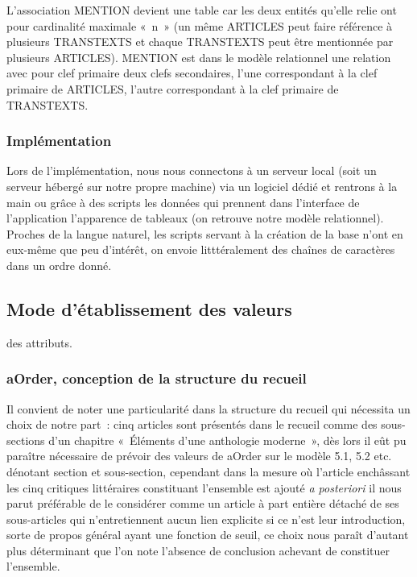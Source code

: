 \documentclass[12pt, a4paper]{article}
\begin{document}
L'association MENTION devient une table car les deux entités qu'elle relie ont pour cardinalité maximale «~n~» (un même ARTICLES peut faire référence à plusieurs TRANSTEXTS et chaque TRANSTEXTS peut être mentionnée par plusieurs ARTICLES). MENTION est dans le modèle relationnel une relation avec pour clef primaire deux clefs secondaires, l'une correspondant à la clef primaire de ARTICLES, l'autre correspondant à la clef primaire de TRANSTEXTS.


\subsubsection{Implémentation}
    Lors de l'implémentation, nous nous connectons à un serveur local (soit un serveur hébergé sur notre propre machine) via un logiciel dédié et rentrons à la main ou grâce à des scripts les données qui prennent dans l'interface de l'application l'apparence de tableaux (on retrouve notre modèle relationnel). Proches de la langue naturel, les scripts servant à la création de la base n'ont en eux-même que peu d'intérêt, on envoie litttéralement des chaînes de caractères dans un ordre donné.

\subsection{Mode d'établissement des valeurs} des attributs.
\label{ref:dbEtabValeurs}
\subsubsection{aOrder, conception de la structure du recueil}
Il convient de noter une particularité dans la structure du recueil qui nécessita un choix de notre part~: cinq articles sont présentés dans le recueil comme des sous-sections d'un chapitre «~Éléments d'une anthologie moderne~», dès lors il eût pu paraître nécessaire de prévoir des valeurs de aOrder sur le modèle 5.1, 5.2 etc. dénotant section et sous-section, cependant dans la mesure où l'article enchâssant les cinq critiques littéraires constituant l'ensemble est ajouté \textit{a posteriori} il nous parut préférable de le considérer comme un article à part entière détaché de ses sous-articles qui n'entretiennent aucun lien explicite si ce n'est leur introduction, sorte de propos général ayant une fonction de seuil, ce choix nous paraît d'autant plus déterminant que l'on note l'absence de conclusion achevant de constituer l'ensemble.
\end{document}
